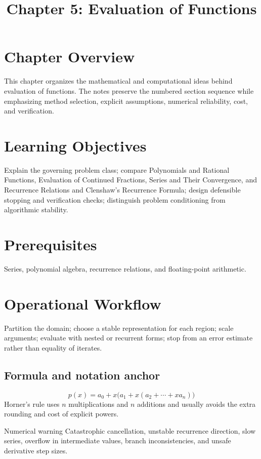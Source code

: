\documentclass[10pt,letterpaper]{article}
\title{Chapter 5: Evaluation of Functions}
\author{}
\date{}
\begin{document}
\maketitle

\section*{Chapter Overview}
This chapter organizes the mathematical and computational ideas behind evaluation of functions. The notes preserve the numbered section sequence while emphasizing method selection, explicit assumptions, numerical reliability, cost, and verification.

\section*{Learning Objectives}
Explain the governing problem class; compare Polynomials and Rational Functions, Evaluation of Continued Fractions, Series and Their Convergence, and Recurrence Relations and Clenshaw's Recurrence Formula; design defensible stopping and verification checks; distinguish problem conditioning from algorithmic stability.

\section*{Prerequisites}
Series, polynomial algebra, recurrence relations, and floating-point arithmetic.

\section*{Operational Workflow}
Partition the domain; choose a stable representation for each region; scale arguments; evaluate with nested or recurrent forms; stop from an error estimate rather than equality of iterates.

\subsection*{Formula and notation anchor}
\[
p(x)=a_0+x\bigl(a_1+x(a_2+\cdots+x a_n)\bigr)
\]
Horner's rule uses $n$ multiplications and $n$ additions and usually avoids the extra rounding and cost of explicit powers.

\begin{warnbox}{Numerical warning}
Catastrophic cancellation, unstable recurrence direction, slow series, overflow in intermediate values, branch inconsistencies, and unsafe derivative step sizes.
\end{warnbox}
\end{document}
